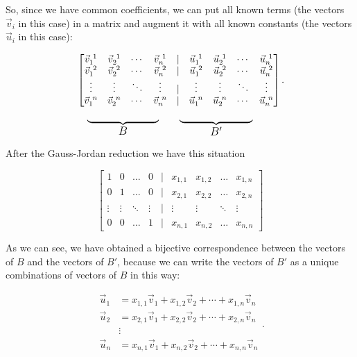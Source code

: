 So, since we have common coefficients, we can put all known terms (the vectors $\vec v_i$ in this case) in a matrix and augment it with all known constants (the vectors $\vec u_i$ in this case):

$$
\begin{aligned}
&\begin{bmatrix}
     \vec v_1^{\ 1} &  \vec v_2^{\ 1} &  \cdots & \vec v_n^{\ 1} & | & \vec u_1^{\ 1} &  \vec u_2^{\ 1} & \cdots & \vec u_n^{\ 1}\\
     \vec v_1^{\ 2} &  \vec v_2^{\ 2} &  \cdots & \vec v_n^{\ 2} & | & \vec u_1^{\ 2} &  \vec u_2^{\ 2} & \cdots & \vec u_n^{\ 2}\\
     \vdots & \vdots & \ddots & \vdots &|& \vdots & \vdots & \ddots &\vdots\\
     \vec v_1^{\ n} &  \vec v_2^{\ n} &  \cdots & \vec v_n^{\ n} & | & \vec u_1^{\ n} &  \vec u_2^{\ n} & \cdots & \vec u_n^{\ n}
\end{bmatrix}.\\ 
& \quad \underbrace{\text{\phantom{----------------------}}}_{\text{\large $B$}} \ \ \ \quad \underbrace{\text{\phantom{-----------------------}}}_{\text{\large $B'$}}
\end{aligned}
$$


After the Gauss-Jordan reduction we have this situation

$$
\begin{bmatrix}
     1 &  0 &  \ldots & 0 & | & x_{1,1} &  x_{1,2} & \ldots & x_{1,n}\\
     0 &  1 &  \ldots & 0 & | & x_{2,1} &  x_{2,2} & \ldots & x_{2,n}\\
     \vdots & \vdots & \ddots & \vdots &|& \vdots & \vdots & \ddots & \vdots\\
     0 &  0 &  \ldots & 1 & | & x_{n,1} &  x_{n,2} & \ldots & x_{n,n}
\end{bmatrix} 
$$

As we can see, we have obtained a bijective correspondence between the vectors of $B$ and the vectors of $B'$, because we can write the vectors of $B'$ as a unique combinations of vectors of $B$ in this way:

$$
\begin{aligned}
\vec u_1 &= x_{1,1} \vec v_1 + x_{1,2} \vec v_2 + \cdots + x_{1,n} \vec v_n\\
\vec u_2 &= x_{2,1} \vec v_1 + x_{2,2} \vec v_2 + \cdots + x_{2,n} \vec v_n\\
&\vdots\\
\vec u_n &= x_{n,1} \vec v_1 + x_{n,2} \vec v_2 + \cdots + x_{n,n} \vec v_n\\
\end{aligned}.
$$


